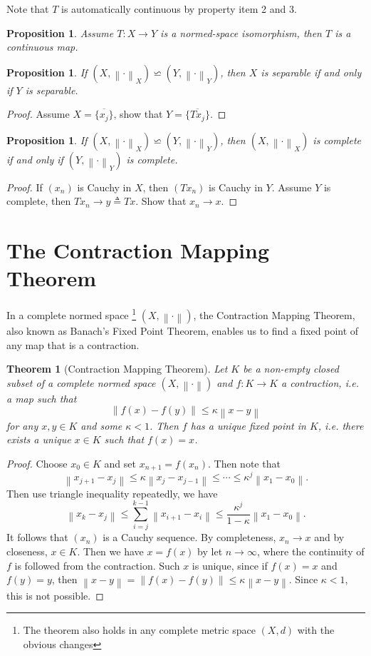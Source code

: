 \documentclass[12pt,a4paper]{article}
\numberwithin{equation}{section}
\theoremstyle{mystyle}
\newtheorem{theorem}[definition]{Theorem}
\newtheorem{proposition}[definition]{Proposition}
\newcommand{\norm}[1]{\left\lVert #1 \right\rVert}
\begin{document}
	Note that $T$ is automatically continuous by property item 2 and 3.
	\begin{proposition}
		Assume $T:X\to Y$ is a normed-space isomorphism, then $T$ is a continuous map.
	\end{proposition}
	
	\begin{proposition}
		If $(X,\norm{\cdot}_X)\backsimeq (Y,\norm{\cdot}_Y)$, then $X$ is separable if and only if $Y$ is separable.
	\end{proposition}
	\begin{proof}
		Assume $X=\overline{\{x_j\}}$, show that $Y=\overline{\{Tx_j\}}$.
	\end{proof}
	\begin{proposition}
		If $(X,\norm{\cdot}_X)\backsimeq (Y,\norm{\cdot}_Y)$, then $(X,\norm{\cdot}_X)$ is complete if and only if $(Y,\norm{\cdot}_Y)$ is complete.
	\end{proposition}
	\begin{proof}
		If $(x_n)$ is Cauchy in $X$, then $(Tx_n)$ is Cauchy in $Y$. Assume $Y$ is complete, then $Tx_n\to y\triangleq Tx$. Show that $x_n\to x$.
	\end{proof}


	\section{The Contraction Mapping Theorem}
	In a complete normed space
	\footnote{The theorem also holds in any complete metric space $(X,d)$ with the obvious changes}
	$(X,\norm{\cdot})$, the Contraction Mapping Theorem, also known as Banach's Fixed Point Theorem, enables us to find a fixed point of any map that is a contraction.
	\begin{theorem}[Contraction Mapping Theorem]
		Let $K$ be a non-empty closed subset of a complete normed space $(X,\norm{\cdot})$ and $f: K\to K$ a contraction, i.e. a map such that
		$$
		\norm{f(x)-f(y)}\leq \kappa \norm{x-y}
		$$
		for any $x,y\in K$ and some $\kappa<1$. Then $f$ has a unique fixed point in $K$, i.e. there exists a unique $x\in K$ such that $f(x)=x$.
	\end{theorem}
	\begin{proof}
		Choose $x_0\in K$ and set $x_{n+1}=f(x_n)$. Then note that
		$$
		\norm{x_{j+1}-x_j}\leq \kappa \norm{x_j-x_{j-1}}\leq \cdots \leq \kappa^j \norm{x_1-x_0}.
		$$
		Then use triangle inequality repeatedly, we have
		$$
		\norm{x_k-x_j}\leq \sum_{i=j}^{k-1}\norm{x_{i+1}-x_i}\leq \frac{\kappa^j}{1-\kappa}\norm{x_1-x_0}.
		$$
		It follows that $(x_n)$ is a Cauchy sequence. By completeness, $x_n\to x$ and by closeness, $x\in K$. Then we have $x=f(x)$ by let $n\to\infty$, where the continuity of $f$ is followed from the contraction. Such $x$ is unique, since if $f(x)=x$ and $f(y)=y$, then $\norm{x-y}=\norm{f(x)-f(y)}\leq \kappa \norm{x-y}$. Since $\kappa<1$, this is not possible.
	\end{proof}
	
\end{document}
